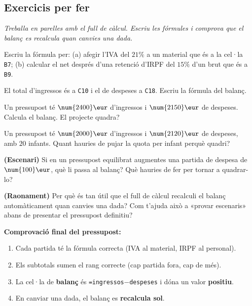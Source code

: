 \subsection{Exercicis per fer}

\noindent\textit{Treballa en parelles amb el full de càlcul. Escriu les fórmules i
comprova que el balanç es recalcula quan canvies una dada.}

\begin{exercicis}
\begin{exlist}
  \item Escriu la fórmula per: (a) afegir l'IVA del $21\%$ a un material que és a la
        cel·la \texttt{B7}; (b) calcular el net després d'una retenció d'IRPF del
        $15\%$ d'un brut que és a \texttt{B9}.
  \item El total d'ingressos és a \texttt{C10} i el de despeses a \texttt{C18}. Escriu
        la fórmula del balanç.
  \item Un pressupost té $\num{2400}\eur$ d'ingressos i $\num{2150}\eur$ de despeses.
        Calcula el balanç. El projecte quadra?
  \item Un pressupost té $\num{2000}\eur$ d'ingressos i $\num{2120}\eur$ de despeses,
        amb $20$ infants. Quant hauries de pujar la quota per infant perquè quadri?
  \item \textbf{(Escenari)} Si en un pressupost equilibrat augmentes una partida de
        despesa de $\num{100}\eur$, què li passa al balanç? Què hauries de fer per
        tornar a quadrar-lo?
  \item \textbf{(Raonament)} Per què és tan útil que el full de càlcul recalculi el
        balanç automàticament quan canvies una dada? Com t'ajuda això a «provar
        escenaris» abans de presentar el pressupost definitiu?
\end{exlist}
\end{exercicis}

\begin{idea}
\textbf{Comprovació final del pressupost:}
\begin{enumerate}[leftmargin=1.6em, itemsep=1pt]
  \item Cada partida té la fórmula correcta (IVA al material, IRPF al personal).
  \item Els subtotals sumen el rang correcte (cap partida fora, cap de més).
  \item La cel·la de \textbf{balanç} és \texttt{=ingressos$-$despeses} i dóna un valor
        \textbf{positiu}.
  \item En canviar una dada, el balanç es \textbf{recalcula sol}.
\end{enumerate}
\end{idea}

